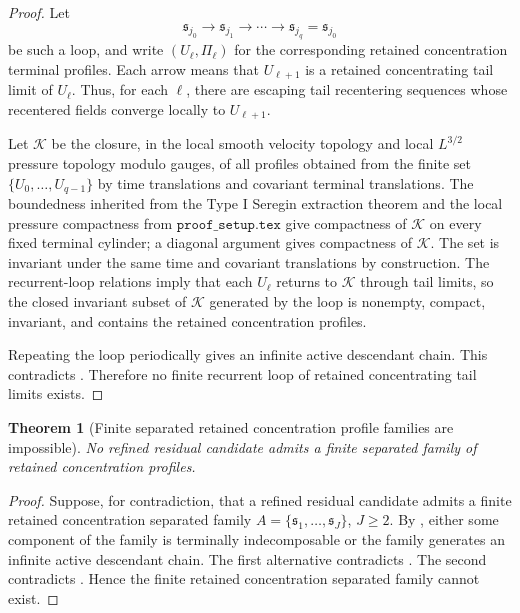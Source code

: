 \documentclass[11pt]{amsart}
\numberwithin{equation}{section}
\theoremstyle{plain}
\newtheorem{theorem}{Theorem}[section]
\theoremstyle{definition}
\theoremstyle{remark}
\newcommand{\calK}{\mathcal K}
\begin{document}
\begin{proof}
Let
\[
   \mathfrak s_{j_0}\to\mathfrak s_{j_1}\to\cdots
   \to\mathfrak s_{j_q}=\mathfrak s_{j_0}
\]
be such a loop, and write \((U_\ell,\Pi_\ell)\) for the corresponding retained
concentration terminal profiles.  Each arrow means that \(U_{\ell+1}\) is a
retained concentrating tail limit of \(U_\ell\).  Thus, for each \(\ell\), there are escaping
tail recentering sequences whose recentered fields converge locally to \(U_{\ell+1}\).

Let \(\calK\) be the closure, in the local smooth velocity topology and local
\(L^{3/2}\) pressure topology modulo gauges, of all profiles obtained from the
finite set \(\{U_0,\dots,U_{q-1}\}\) by time translations and covariant
terminal translations.  The boundedness inherited from the Type I Seregin
extraction theorem and the local pressure compactness from
\(\texttt{proof\_setup.tex}\) give compactness of \(\calK\) on every fixed terminal
cylinder; a diagonal argument gives compactness of \(\calK\).  The set is
invariant under the same time and covariant translations by construction.  The
recurrent-loop relations imply that each \(U_\ell\)
returns to \(\calK\) through tail limits, so the closed invariant subset of
\(\calK\) generated by the loop is nonempty, compact, invariant, and contains
the retained concentration profiles.

Repeating the loop periodically gives an infinite active descendant chain.
This contradicts .  Therefore no finite
recurrent loop of retained concentrating tail limits exists.
\end{proof}

\begin{theorem}[Finite separated retained concentration profile families are impossible]
\label{thm:no-finite-separated-profile-family}
No refined residual candidate admits a finite separated family of retained
concentration profiles.
\end{theorem}

\begin{proof}
Suppose, for contradiction, that a refined residual candidate admits a finite
retained concentration separated family \(A=\{\mathfrak s_1,\dots,\mathfrak s_J\}\),
\(J\ge2\).  By , either some component of the
family is terminally indecomposable or the family generates an infinite active
descendant chain.  The first alternative contradicts
.  The second contradicts
.  Hence the finite retained concentration
separated family cannot exist.
\end{proof}
\end{document}
